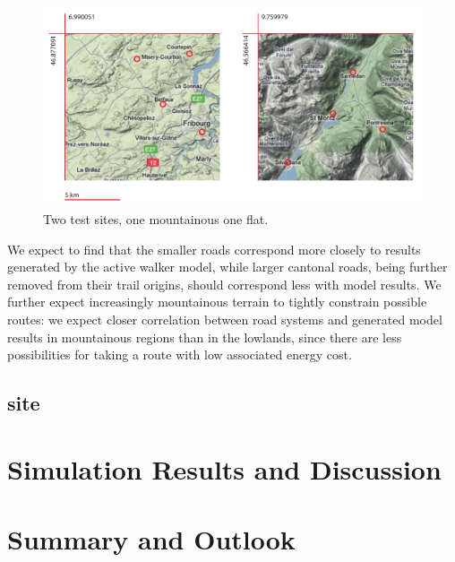 \documentclass[a4paper, DIV11, abstracton]{scrartcl}
\begin{document}
\begin{figure}[tbp]
	\includegraphics[width=\linewidth]{../figures/site}
	\caption{Two test sites, one mountainous one flat.}
	\label{fig:site}
\end{figure}

We expect to find that the smaller roads correspond more closely to results generated by the active walker model, while larger cantonal roads, being further removed from their trail origins, should correspond less with model results. We further expect increasingly mountainous terrain to tightly constrain possible routes: we expect closer correlation between road systems and generated model results in mountainous regions than in the lowlands, since there are less possibilities for taking a route with low associated energy cost.


\subsection{site}







\section{Simulation Results and Discussion}

\section{Summary and Outlook}




\end{document}
